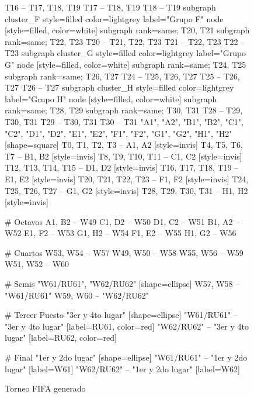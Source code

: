 \documentclass[a4paper]{article}
\begin{document}
\begin{figure}[H]
\begin{center}
{{                T16 -- T17, T18, T19
                T17 -- T18, T19
                T18 -- T19
            }
            subgraph cluster_F {
                style=filled
                color=lightgrey
                label="Grupo F"
                node [style=filled, color=white]
                subgraph { rank=same; T20, T21 }
                subgraph { rank=same; T22, T23 }
                T20 -- T21, T22, T23
                T21 -- T22, T23
                T22 -- T23
            }
            subgraph cluster_G {
                style=filled
                color=lightgrey
                label="Grupo G"
                node [style=filled, color=white]
                subgraph { rank=same; T24, T25 }
                subgraph { rank=same; T26, T27 }
                T24 -- T25, T26, T27
                T25 -- T26, T27
                T26 -- T27
            }
            subgraph cluster_H {
                style=filled
                color=lightgrey
                label="Grupo H"
                node [style=filled, color=white]
                subgraph { rank=same; T28, T29 }
                subgraph { rank=same; T30, T31 }
                T28 -- T29, T30, T31
                T29 -- T30, T31
                T30 -- T31
            }
            "A1", "A2",
            "B1", "B2",
            "C1", "C2",
            "D1", "D2",
            "E1", "E2",
            "F1", "F2",
            "G1", "G2",
            "H1", "H2" [shape=square]
             T0,  T1,  T2,  T3 -- A1, A2 [style=invis]
             T4,  T5,  T6,  T7 -- B1, B2 [style=invis]
             T8,  T9, T10, T11 -- C1, C2 [style=invis]
            T12, T13, T14, T15 -- D1, D2 [style=invis]
            T16, T17, T18, T19 -- E1, E2 [style=invis]
            T20, T21, T22, T23 -- F1, F2 [style=invis]
            T24, T25, T26, T27 -- G1, G2 [style=invis]
            T28, T29, T30, T31 -- H1, H2 [style=invis]

            # Octavos
            A1, B2 -- W49
            C1, D2 -- W50
            D1, C2 -- W51
            B1, A2 -- W52
            E1, F2 -- W53
            G1, H2 -- W54
            F1, E2 -- W55
            H1, G2 -- W56

            # Cuartos
            W53, W54 -- W57
            W49, W50 -- W58
            W55, W56 -- W59
            W51, W52 -- W60

            # Semis
            "W61/RU61", "W62/RU62" [shape=ellipse]
            W57, W58 -- "W61/RU61"
            W59, W60 -- "W62/RU62"

            # Tercer Puesto
            "3er y 4to lugar" [shape=ellipse]
            "W61/RU61" -- "3er y 4to lugar" [label=RU61, color=red]
            "W62/RU62" -- "3er y 4to lugar" [label=RU62, color=red]

            # Final
            "1er y 2do lugar" [shape=ellipse]
            "W61/RU61" -- "1er y 2do lugar" [label=W61]
            "W62/RU62" -- "1er y 2do lugar" [label=W62]
        }
    \end{center}
    \caption{Torneo FIFA generado}
    \label{fig:fifa-tournament}
\end{figure}
\end{document}
